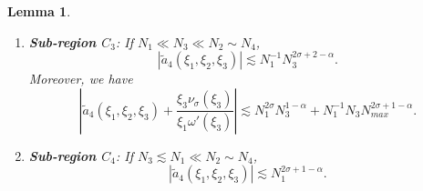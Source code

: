 \documentclass{amsart}
\newtheorem{lemma}[theorem]{Lemma}
\theoremstyle{definition}
\theoremstyle{remark}
\numberwithin{equation}{section}
\begin{document}
\begin{lemma}
\begin{enumerate}
\begin{enumerate}
\begin{equation}
      |\widetilde{a}_4(\xi_1,\xi_2,\xi_3)| \lesssim N_1^{-1} N_{max}^{2\sigma+2-\alpha} .
    \end{equation}
    \item {\bf Sub-region $C_3$}: If $N_1\ll N_3\ll N_2\sim N_4$,
    \begin{equation}\label{a4tilde-C3b}
      |\widetilde{a}_4(\xi_1,\xi_2,\xi_3)| \lesssim N_1^{-1} N_3^{2\sigma+2-\alpha} .
    \end{equation}
    Moreover, we have 
   \begin{equation}\label{a4tilde-C3}
      \left|\widetilde{a}_4(\xi_1,\xi_2,\xi_3) + \frac{\xi_3\nu_\sigma(\xi_3)}{\xi_1\omega'(\xi_3)} \right| \lesssim N_1^{2\sigma}N_3^{1-\alpha} + N_1^{-1}N_3N_{max}^{2\sigma+1-\alpha} .
    \end{equation}
    
    \item {\bf Sub-region $C_4$}: If $N_3\lesssim N_1\ll N_2\sim N_4$,
       \begin{equation}\label{a4tilde-C4}
      |\widetilde{a}_4(\xi_1,\xi_2,\xi_3)| \lesssim N_1^{2\sigma+1-\alpha} .
    \end{equation}
    \end{enumerate}
  \end{enumerate}
\end{lemma}
\end{document}
